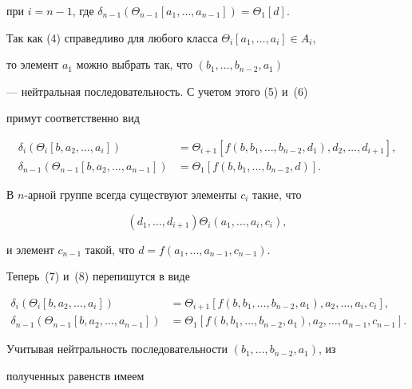 \begin{pf}
при $i = n-1$, где $\delta_{n-1}(\Theta_{n-1}[a_1,\dotsc, a_{n-1}]) =


\Theta_1[d]$.





Так как (4) справедливо для любого класса $\Theta_i[a_1,\dotsc, a_i]\in A_i$,


то элемент $a_1$ можно выбрать так, что $(b_1,\dotsc, b_{n-2}, a_1)$


--- нейтральная последовательность. С учетом этого (5) и~(6)


примут соответственно вид


\begin{align}


\delta_i(\Theta_i[b, a_2,\dotsc, a_i]) &=


\Theta_{i+1}[f(b, b_1,\dotsc, b_{n-2}, d_1), d_2,\dotsc, d_{i+1}], \\


%


\delta_{n-1}(\Theta_{n-1}[b, a_2,\dotsc, a_{n-1}]) &=


\Theta_1[f(b, b_1,\dotsc, b_{n-2}, d)].


\end{align}


В $n$-арной группе всегда существуют элементы $c_i$ такие, что


$$


(d_1,\dotsc, d_{i+1})\Theta_i (a_1,\dotsc, a_i, c_i),


$$


и элемент $c_{n-1}$ такой, что $d = f(a_1,\dotsc, a_{n-1}, c_{n-1})$.


Теперь~(7) и~(8) перепишутся в виде


\begin{align*}


\delta_i(\Theta_i[b, a_2,\dotsc, a_i]) &=


\Theta_{i+1}[f(b, b_1,\dotsc, b_{n-2}, a_1), a_2,\dotsc, a_i, c_i], \\


%


\delta_{n-1}(\Theta_{n-1}[b, a_2,\dotsc, a_{n-1}]) &=


\Theta_1[f(b, b_1,\dotsc, b_{n-2}, a_1), a_2,\dotsc, a_{n-1}, c_{n-1}].


\end{align*}


Учитывая нейтральность последовательности $(b_1,\dotsc, b_{n-2}, a_1)$, из


полученных равенств имеем



\end{pf}
